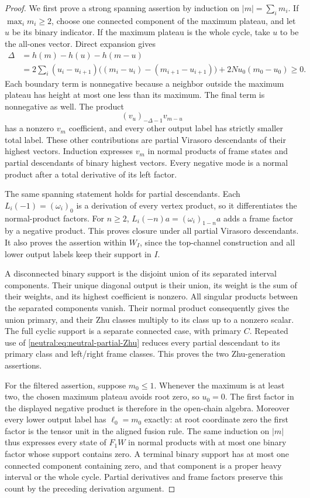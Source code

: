 \documentclass[11pt,a4paper]{article}
\numberwithin{equation}{section}
\theoremstyle{definition}\newtheorem{definition}[theorem]{Definition}
\theoremstyle{remark}\newtheorem{remark}[theorem]{Remark}
\begin{document}
\begin{proof}
We first prove a strong spanning assertion by induction on
$|m|=\sum_i m_i$.  If $\max_i m_i\geq2$, choose one connected
component of the maximum plateau, and let $u$ be its binary
indicator.  If the maximum plateau is the whole cycle, take $u$
to be the all-ones vector.  Direct expansion gives
\begin{align*}
 \Delta&=h(m)-h(u)-h(m-u)\\
 &=2\sum_i(u_i-u_{i+1})
       \bigl((m_i-u_i)-(m_{i+1}-u_{i+1})\bigr)
                                  +2Nu_0(m_0-u_0)\geq0.
\end{align*}
Each boundary term is nonnegative because a neighbor outside the
maximum plateau has height at most one less than its maximum.
The final term is nonnegative as well.
The product
\[
                       (v_u)_{-\Delta-1}v_{m-u}
\]
has a nonzero $v_m$ coefficient, and every other output label has
strictly smaller total label.  These other contributions are partial
Virasoro descendants of their highest vectors.  Induction expresses
$v_m$ in normal products of frame states and partial descendants of
binary highest vectors.  Every negative mode is a normal product
after a total derivative of its left factor.

The same spanning statement holds for partial descendants.  Each
$L_i(-1)=(\omega_i)_0$ is a derivation of every vertex product, so
it differentiates the normal-product factors.  For $n\geq2$,
$L_i(-n)a=(\omega_i)_{1-n}a$ adds a frame factor by a negative
product.  This proves closure under all partial Virasoro descendants.
It also proves the assertion within $W_I$, since the top-channel
construction and all lower output labels keep their support in $I$.

A disconnected binary support is the disjoint union of its separated
interval components.  Their unique diagonal output is their union,
its weight is the sum of their weights, and its highest coefficient
is nonzero.  All singular products between the separated components
vanish.  Their normal product consequently gives the union primary,
and their Zhu classes multiply to its class up to a nonzero scalar.
The full cyclic support is a separate connected case, with primary
$C$.  Repeated use of \eqref{neutral:eq:neutral-partial-Zhu} reduces
every partial descendant to its primary class and left/right frame
classes.  This proves the two Zhu-generation assertions.

For the filtered assertion, suppose $m_0\leq1$.  Whenever the maximum
is at least two, the chosen maximum plateau avoids root zero, so
$u_0=0$.  The first factor in the displayed negative product is
therefore in the open-chain algebra.  Moreover every lower output
label has $\ell_0=m_0$ exactly: at root coordinate zero the first
factor is the tensor unit in the aligned fusion rule.  The same
induction on $|m|$ thus expresses every state of $F_1W$ in normal
products with at most one binary factor whose support contains zero.
A terminal binary support has at most one connected component
containing zero, and that component is a proper heavy interval or
the whole cycle.  Partial derivatives and frame factors preserve
this count by the preceding derivation argument.


\end{proof}
\end{document}
